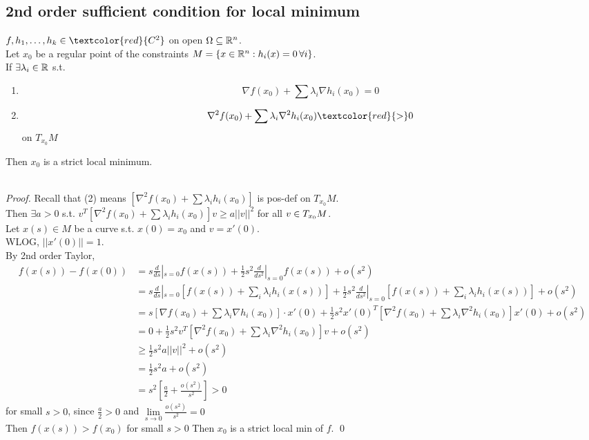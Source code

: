 \documentclass[11pt]{article}
\begin{document}
\subsection{2nd order sufficient condition for local minimum}
$f, h_1, \hdots, h_k \in \textcolor{red}{C^2}$ on open $\Omega \subseteq \mathbb{R}^n$. \\
Let $x_0$ be a regular point of the constraints $ M = \{ x \in \mathbb{R}^n: h_i(x) = 0 \, \forall i\}$. \\
If $\exists \lambda_i \in \mathbb{R}$ s.t.
\begin{enumerate}
	\item $$ \nabla f(x_0) + \sum \lambda_i \nabla h_i(x_0) = 0$$
	\item $$ \nabla^2 f(x_0) + \sum \lambda_i \nabla^2 h_i(x_0) \textcolor{red}{>} 0$$ on $T_{x_0} M$
\end{enumerate}
Then $x_0$ is a strict local minimum.\\\\
\begin{proof}
	Recall that (2) means $[\nabla^2 f(x_0) + \sum \lambda_i h_i(x_0)]$ is pos-def on $T_{x_0}M$. \\
	Then $ \exists a > 0$ s.t. $v^T [\nabla^2 f(x_0) + \sum \lambda_i h_i(x_0)] v \geq a||v||^2$ for all $v \in T_{x_0}M$. \\
	Let $x(s) \in M$ be a curve s.t. $x(0) = x_0$ and $v = x'(0)$. \\
	WLOG, $||x'(0)|| = 1$.\\
	By 2nd order Taylor, 
	\begin{align*}
		f(x(s)) - f(x(0)) &= s\frac{d}{ds}|_{s=0} f(x(s)) + \frac{1}{2} s^2 \frac{d}{ds^2} |_{s=0} f(x(s)) + o(s^2)\\
		&= s\frac{d}{ds}|_{s=0} [f(x(s)) + \sum_i \lambda_i h_i(x(s)) ]+ \frac{1}{2} s^2 \frac{d}{ds^2}|_{s=0} [f(x(s)) + \sum_i \lambda_i h_i(x(s)) ] + o(s^2) \tag{$\sum_i \lambda_i h_i(x(s)) = 0$}\\
		&=  s[\nabla f(x_0) + \sum \lambda_i \nabla h_i(x_0)] \cdot x'(0) + \frac{1}{2}s^2x'(0)^T[\nabla^2f(x_0) + \sum \lambda_i \nabla^2h_i(x_0)] x'(0) + o(s^2) \\
		&= 0 + \frac{1}{2} s^2 v^T[\nabla^2f(x_0) + \sum \lambda_i \nabla^2h_i(x_0)]v + o(s^2) \\
		&\geq \frac{1}{2}s^2 a||v||^2 + o(s^2) \\
		&= \frac{1}{2}s^2 a + o(s^2) \\
		&= s^2 [\frac{a}{2} + \frac{o(s^2)}{s^2}] > 0
	\end{align*}
	for small $s >0$, since $\frac{a}{2} > 0$ and $\underset{s \rightarrow 0}{\lim} \frac{o(s^2)}{s^2} = 0$ \\
	Then $f(x(s)) > f(x_0)$ for small $s > 0$
	Then $x_0$ is a strict local min of $f$. \qed
\end{proof}
\end{document}
